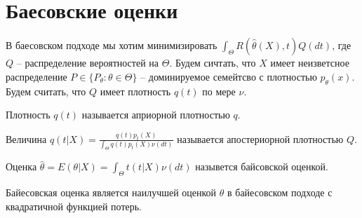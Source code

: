 \documentclass[document.tex]{subfiles}
\begin{document}
\section{Баесовские оценки}
В баесовском подходе мы хотим минимизировать
$\int_{\Theta} R(\hat \theta(X), t) Q(dt)$, где $Q$ -- распределение вероятностей на $\Theta$. Будем сичтать, что $X$
имеет неизветсное распределение $P \in \{P_{\theta} : \theta \in \Theta\}$ -- доминируемое семейтсво с плотностью
$p_{\theta}(x)$. Будем считать, что $Q$ имеет плотность $q(t)$ по мере $\nu$.

\begin{definition}
    Плотность $q(t)$ называется априорной плотностью $q$. 
\end{definition}

\begin{definition}
    Величина $q(t | X) = \frac{q(t) p_t(X)}{\int_{\Theta} q(t) p_t(X) \nu(dt)}$ называется апостериорной плотностью $Q$.
\end{definition}

\begin{definition}
    Оценка $\hat \theta = E(\theta | X) = \int_{\Theta} t (t | X) \nu(dt)$ назывется байсовской оценкой.
\end{definition}

\begin{theorem}
    Байесовская оценка является наилучшей оценкой $\theta$ в байесовском подходе с квадратичной функцией потерь.
\end{theorem}
\end{document}
